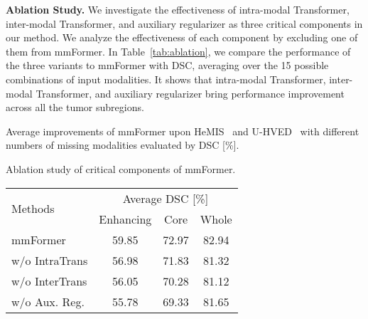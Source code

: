 \documentclass[runningheads]{llncs}
\begin{document}
\noindent\textbf{Ablation Study.}
We investigate the effectiveness of intra-modal Transformer, inter-modal Transformer, and auxiliary regularizer as three critical components in our method. We analyze the effectiveness of each component by excluding one of them from mmFormer. In Table~\ref{tab:ablation}, we compare the performance of the three variants to mmFormer with DSC, averaging over the 15 possible combinations of input modalities. It shows that intra-modal Transformer, inter-modal Transformer, and auxiliary regularizer bring performance improvement across all the tumor subregions.



\begin{center}
\begin{minipage}[!tp]{\textwidth}
\begin{minipage}[!tp]{0.48\textwidth}
\centering
\makeatletter{}
\caption{Average improvements of mmFormer upon HeMIS~\cite{havaei2016hemis} and U-HVED~\cite{dorent2019hetero} with different numbers of missing modalities evaluated by DSC [\%].}
\label{tab:improvement}
\end{minipage}
\begin{minipage}[!tp]{0.48\textwidth}
\centering
\makeatletter{}
\caption{Ablation study of critical components of mmFormer.}
\begin{tabular}{l|ccc}
\toprule
\multirow{2}{*}{Methods} & \multicolumn{3}{c}{Average DSC [\%]}                               \\ \cline{2-4} 
                         & Enhancing & Core & Whole \\ \midrule
mmFormer                 &  59.85  & 72.97  & 82.94   \\ \hline
w/o IntraTrans                 &  56.98  & 71.83   &  81.32  \\ \hline
w/o InterTrans                 &  56.05  & 70.28   &  81.12  \\ \hline
w/o Aux. Reg.                 &  55.78  & 69.33   &  81.65  \\ \bottomrule
\end{tabular}
\label{tab:ablation}
\end{minipage}
\end{minipage}
\end{center}
\end{document}
